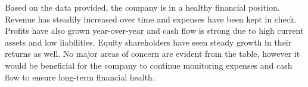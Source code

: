 

Based on the data provided, the company is in a healthy financial position. Revenue has steadily increased over time and expenses have been kept in check. Profits have also grown year-over-year and cash flow is strong due to high current assets and low liabilities. Equity shareholders have seen steady growth in their returns as well. No major areas of concern are evident from the table, however it would be beneficial for the company to continue monitoring expenses and cash flow to ensure long-term financial health.